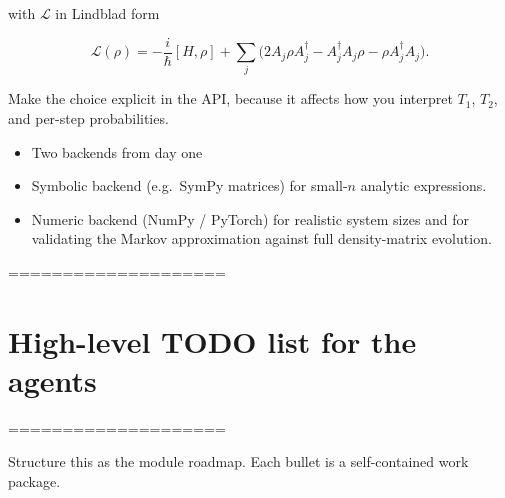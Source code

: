\documentclass[11pt]{article}
\begin{document}
    with $\mathcal{L}$ in Lindblad form
    
\begin{equation}
\mathcal{L}(\rho)
      = -\frac{i}{\hbar}[H,\rho]
        + \sum_j \Big(
          2 A_j \rho A_j^\dagger
          - A_j^\dagger A_j \rho
          - \rho A_j^\dagger A_j
        \Big).
\end{equation}

  Make the choice explicit in the API, because it affects how you interpret $T_1$, $T_2$, and per-step probabilities.

\begin{itemize}
\item Two backends from day one  
\item Symbolic backend (e.g.\ SymPy matrices) for small-$n$ analytic expressions.  
\item Numeric backend (NumPy / PyTorch) for realistic system sizes and for validating the Markov approximation against full density-matrix evolution.
\end{itemize}

====================
\section{High-level TODO list for the agents}
====================

Structure this as the module roadmap. Each bullet is a self-contained work package.
\end{document}
